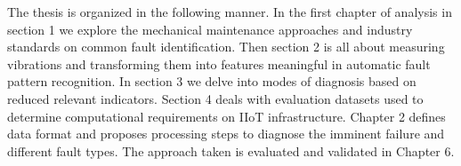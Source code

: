 The thesis is organized in the following manner. In the first chapter of analysis in section 1 we explore the mechanical maintenance approaches and industry standards on common fault identification. Then section 2 is all about measuring vibrations and transforming them into features meaningful in automatic fault pattern recognition. In section 3 we delve into modes of diagnosis based on reduced relevant indicators. Section 4 deals with evaluation datasets used to determine computational requirements
on IIoT infrastructure. Chapter 2 defines data format and proposes processing steps to diagnose the imminent failure and different fault types. The approach taken is evaluated and validated in Chapter 6. 
  